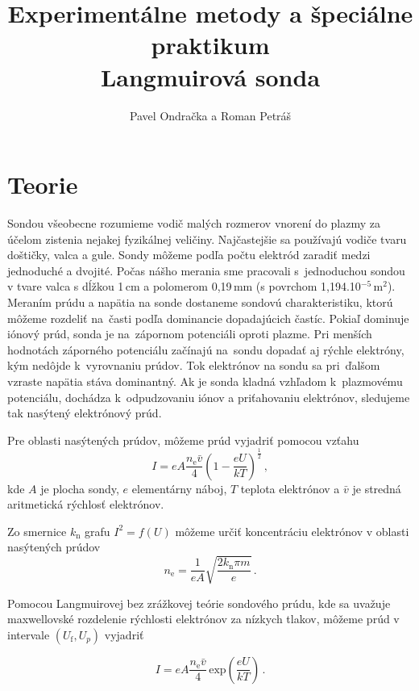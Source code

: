 \documentclass[12pt]{article}
\begin{document}
\title{Experimentálne metody a špeciálne praktikum \\
Langmuirová sonda}
\author{Pavel Ondračka a Roman Petráš}
\maketitle

\section{Teorie}
Sondou všeobecne rozumieme vodič malých rozmerov vnorení do plazmy za účelom zistenia nejakej fyzikálnej veličiny. Najčastejšie sa používajú vodiče tvaru doštičky, valca a gule. Sondy môžeme podľa počtu elektród zaradiť medzi jednoduché a dvojité. Počas nášho merania sme pracovali s~jednoduchou sondou v tvare valca s dĺžkou 1\,cm a polomerom 0,19\,mm (s povrchom 1,194.10$^{-5}$\,m$^2$). Meraním prúdu a napätia na sonde dostaneme sondovú charakteristiku, ktorú môžeme rozdeliť na~časti podľa dominancie dopadajúcich častíc. Pokiaľ dominuje iónový prúd, sonda je na~zápornom potenciáli oproti plazme. Pri menších hodnotách záporného potenciálu začínajú na~sondu dopadať aj rýchle elektróny, kým nedôjde k~vyrovnaniu prúdov. Tok elektrónov na sondu sa pri~ďalšom vzraste napätia stáva dominantný. Ak je sonda kladná vzhľadom k~plazmovému potenciálu, do\-chádza k~odpudzovaniu iónov a priťahovaniu elektrónov, sledujeme tak nasýtený elektrónový prúd.

Pre oblasti nasýtených prúdov, môžeme prúd vyjadriť pomocou vzťahu
\begin{equation}
I=eA \frac{n_\mathrm{e} \bar{v}}{4} \left(1 - \frac{e U}{k T}\right)^{\frac{1}{2}} \, \mathrm{,}
\end{equation}
kde $A$ je plocha sondy, $e$ elementárny náboj, $T$ teplota elektrónov a $\bar{v}$ je stredná aritmetická rýchlosť elektrónov.

Zo smernice $k_\mathrm{n}$ grafu $I^2 = f(U)$ môžeme určiť koncentráciu elektrónov v oblasti nasýtených prúdov
\begin{equation}
n_\mathrm{e} = \frac{1}{eA}\sqrt{\frac{2 k_\mathrm{n} \pi m}{e}} \, \mathrm{.}
\end{equation}

Pomocou Langmuirovej bez zrážkovej teórie sondového prúdu, kde sa uvažuje maxwellovské rozdelenie rýchlosti elektrónov za nízkych tlakov, môžeme prúd v intervale $(U_\mathrm{f} , U_p)$ vyjadriť

\begin{equation}
I=eA \frac{n_\mathrm{e} \bar{v}}{4} \, \mathrm{exp}\left(\frac{e U}{k T}\right) \, \mathrm{.}
\end{equation}
\end{document}
